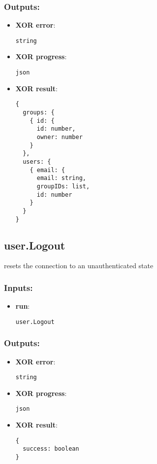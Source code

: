 \subsubsection*{Outputs:}
\begin{itemize}
  \small
    \item \textbf{XOR error}: 
\begin{lstlisting}
string
\end{lstlisting}
    \item \textbf{XOR progress}: 
\begin{lstlisting}
json
\end{lstlisting}
    \item \textbf{XOR result}: 
\begin{lstlisting}
{
  groups: {
    { id: {
      id: number, 
      owner: number
    }
  }, 
  users: {
    { email: {
      email: string, 
      groupIDs: list, 
      id: number
    }
  }
}
\end{lstlisting}
  \end{itemize}

\subsection{user.Logout}
\label{ch:builtinservices:user.Logout}
resets the connection to an unauthenticated state
\subsubsection*{Inputs:}
\begin{itemize}
  \small
    \item \textbf{run}: 
\begin{lstlisting}
user.Logout
\end{lstlisting}
  \end{itemize}
\subsubsection*{Outputs:}
\begin{itemize}
  \small
    \item \textbf{XOR error}: 
\begin{lstlisting}
string
\end{lstlisting}
    \item \textbf{XOR progress}: 
\begin{lstlisting}
json
\end{lstlisting}
    \item \textbf{XOR result}: 
\begin{lstlisting}
{
  success: boolean
}
\end{lstlisting}
  \end{itemize}

